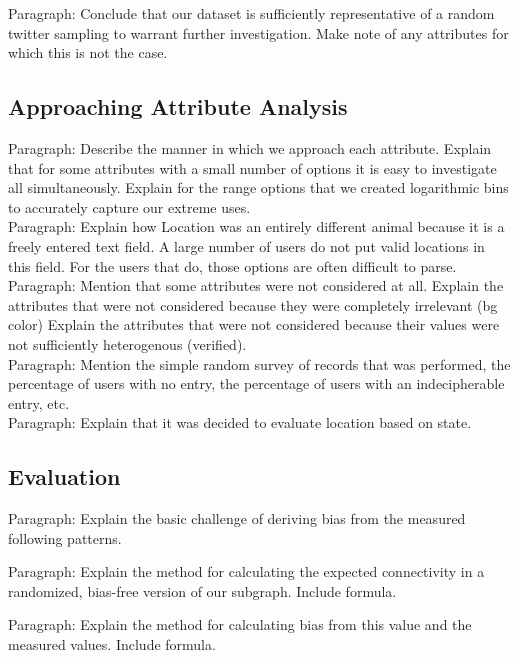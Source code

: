 Paragraph: Conclude that our dataset is sufficiently representative of a random twitter sampling to warrant further investigation.  Make note of any attributes for which this is not the case.\\

\subsection{Approaching Attribute Analysis}

Paragraph: Describe the manner in which we approach each attribute.  Explain that for some attributes with a small number of options it is easy to investigate all simultaneously.  Explain for the range options that we created logarithmic bins to accurately capture our extreme uses.\\

Paragraph: Explain how Location was an entirely different animal because it is a freely entered text field.  A large number of users do not put valid locations in this field.  For the users that do, those options are often difficult to parse.\\

Paragraph:  Mention that some attributes were not considered at all.  Explain the attributes that were not considered because they were completely irrelevant (bg color)  Explain the attributes that were not considered because their values were not sufficiently heterogenous (verified).\\

Paragraph: Mention the simple random survey of records that was performed, the percentage of users with no entry, the percentage of users with an indecipherable entry, etc.\\

Paragraph: Explain that it was decided to evaluate location based on state.\\

\subsection{Evaluation}

Paragraph: Explain the basic challenge of deriving bias from the measured following patterns.

Paragraph: Explain the method for calculating the expected connectivity in a randomized, bias-free version of our subgraph.  Include formula.

Paragraph: Explain the method for calculating bias from this value and the measured values.  Include formula.

